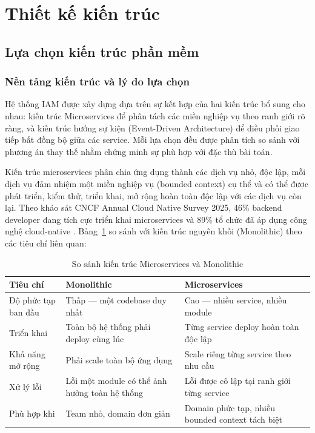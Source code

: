 \documentclass[../DoAn.tex]{subfiles}
\begin{document}
\section{Thiết kế kiến trúc}
\label{section:4.1}

\subsection{Lựa chọn kiến trúc phần mềm}
\label{subsection:4.1.1}

\subsubsection{Nền tảng kiến trúc và lý do lựa chọn}

Hệ thống IAM được xây dựng dựa trên sự kết hợp của hai kiến trúc bổ sung cho nhau: kiến trúc Microservices để phân tách các miền nghiệp vụ theo ranh giới rõ ràng, và kiến trúc hướng sự kiện (Event-Driven Architecture) để điều phối giao tiếp bất đồng bộ giữa các service. Mỗi lựa chọn đều được phân tích so sánh với phương án thay thế nhằm chứng minh sự phù hợp với đặc thù bài toán.

Kiến trúc microservices phân chia ứng dụng thành các dịch vụ nhỏ, độc lập, mỗi dịch vụ đảm nhiệm một miền nghiệp vụ (bounded context) cụ thể và có thể được phát triển, kiểm thử, triển khai, mở rộng hoàn toàn độc lập với các dịch vụ còn lại. Theo khảo sát CNCF Annual Cloud Native Survey 2025, 46\% backend developer đang tích cực triển khai microservices và 89\% tổ chức đã áp dụng công nghệ cloud-native \cite{cncf_survey_2025}. Bảng~\ref{tab:microservices-vs-monolithic} so sánh với kiến trúc nguyên khối (Monolithic) theo các tiêu chí liên quan:

\begin{table}[H]
\centering
\caption{So sánh kiến trúc Microservices và Monolithic}
\label{tab:microservices-vs-monolithic}
\begin{tabular}{|p{3.5cm}|p{5cm}|p{5cm}|}
\hline
\textbf{Tiêu chí} & \textbf{Monolithic} & \textbf{Microservices} \\
\hline
Độ phức tạp ban đầu & Thấp — một codebase duy nhất & Cao — nhiều service, nhiều module \\
\hline
Triển khai & Toàn bộ hệ thống phải deploy cùng lúc & Từng service deploy hoàn toàn độc lập \\
\hline
Khả năng mở rộng & Phải scale toàn bộ ứng dụng & Scale riêng từng service theo nhu cầu \\
\hline
Xử lý lỗi & Lỗi một module có thể ảnh hưởng toàn hệ thống & Lỗi được cô lập tại ranh giới từng service \\
\hline
Phù hợp khi & Team nhỏ, domain đơn giản & Domain phức tạp, nhiều bounded context tách biệt \\
\hline
\end{tabular}
\end{table}
\end{document}
